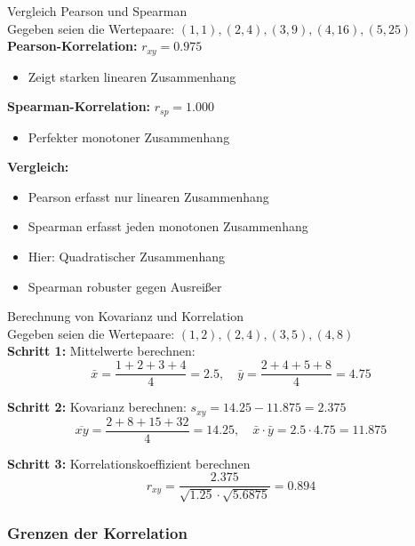 \begin{example2}{Vergleich Pearson und Spearman}\\
Gegeben seien die Wertepaare:
$(1,1), (2,4), (3,9), (4,16), (5,25)$
\vspace{2mm}\\
\textbf{Pearson-Korrelation:} $r_{xy} = 0.975$
\begin{itemize}
    \item Zeigt starken linearen Zusammenhang
\end{itemize}
\vspace{2mm}
\textbf{Spearman-Korrelation:} $r_{sp} = 1.000$
\begin{itemize}
    \item Perfekter monotoner Zusammenhang
\end{itemize}
\vspace{2mm}
\textbf{Vergleich:}
\begin{itemize}
    \item Pearson erfasst nur linearen Zusammenhang
    \item Spearman erfasst jeden monotonen Zusammenhang
    \item Hier: Quadratischer Zusammenhang
    \item Spearman robuster gegen Ausreißer
\end{itemize}
\end{example2}


\begin{example2}{Berechnung von Kovarianz und Korrelation}\\
Gegeben seien die Wertepaare:
$(1,2), (2,4), (3,5), (4,8)$
\vspace{2mm}\\
\textbf{Schritt 1:} Mittelwerte berechnen:
$$\bar{x} = \frac{1+2+3+4}{4} = 2.5, \quad \bar{y} = \frac{2+4+5+8}{4} = 4.75$$

\textbf{Schritt 2:} Kovarianz berechnen: $s_{xy} = 14.25 - 11.875 = 2.375$
$$\overline{xy} = \frac{2+8+15+32}{4} = 14.25,\quad \bar{x} \cdot \bar{y} = 2.5 \cdot 4.75 = 11.875$$

\textbf{Schritt 3:} Korrelationskoeffizient berechnen
\vspace{2mm}\\
$$r_{xy} = \frac{2.375}{\sqrt{1.25} \cdot \sqrt{5.6875}} = 0.894$$
\end{example2}

\subsubsection{Grenzen der Korrelation}

